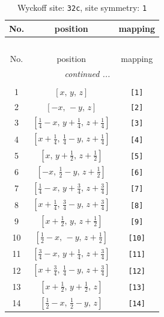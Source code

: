 \documentclass[fleqn,8pt]{jsarticle}
\begin{document}
\renewcommand{\arraystretch}{1.2}
\begin{longtable}{ccc}
\caption{Wyckoff site: {\tt 32c}, site symmetry: {\tt 1}}
 \\
 \hline \hline
No. & position & mapping \\ \hline \endfirsthead

\multicolumn{2}{l}{\tablename\ \thetable{}} \\
 \hline \hline
No. & position & mapping \\ \hline \endhead

 \hline \hline
\multicolumn{2}{r}{\footnotesize\it continued ...} \\ \endfoot

 \hline \hline
\multicolumn{2}{r}{} \\ \endlastfoot

1 & $\left[ x,\, y,\, z \right]$ & {\tt [1]} \\ \hline
2 & $\left[ - x,\, - y,\, z \right]$ & {\tt [2]} \\ \hline
3 & $\left[ \frac{1}{4} - x,\, y + \frac{1}{4},\, z + \frac{1}{4} \right]$ & {\tt [3]} \\ \hline
4 & $\left[ x + \frac{1}{4},\, \frac{1}{4} - y,\, z + \frac{1}{4} \right]$ & {\tt [4]} \\ \hline
5 & $\left[ x,\, y + \frac{1}{2},\, z + \frac{1}{2} \right]$ & {\tt [5]} \\ \hline
6 & $\left[ - x,\, \frac{1}{2} - y,\, z + \frac{1}{2} \right]$ & {\tt [6]} \\ \hline
7 & $\left[ \frac{1}{4} - x,\, y + \frac{3}{4},\, z + \frac{3}{4} \right]$ & {\tt [7]} \\ \hline
8 & $\left[ x + \frac{1}{4},\, \frac{3}{4} - y,\, z + \frac{3}{4} \right]$ & {\tt [8]} \\ \hline
9 & $\left[ x + \frac{1}{2},\, y,\, z + \frac{1}{2} \right]$ & {\tt [9]} \\ \hline
10 & $\left[ \frac{1}{2} - x,\, - y,\, z + \frac{1}{2} \right]$ & {\tt [10]} \\ \hline
11 & $\left[ \frac{3}{4} - x,\, y + \frac{1}{4},\, z + \frac{3}{4} \right]$ & {\tt [11]} \\ \hline
12 & $\left[ x + \frac{3}{4},\, \frac{1}{4} - y,\, z + \frac{3}{4} \right]$ & {\tt [12]} \\ \hline
13 & $\left[ x + \frac{1}{2},\, y + \frac{1}{2},\, z \right]$ & {\tt [13]} \\ \hline
14 & $\left[ \frac{1}{2} - x,\, \frac{1}{2} - y,\, z \right]$ & {\tt [14]} \\ \hline

\end{longtable}
\end{document}
